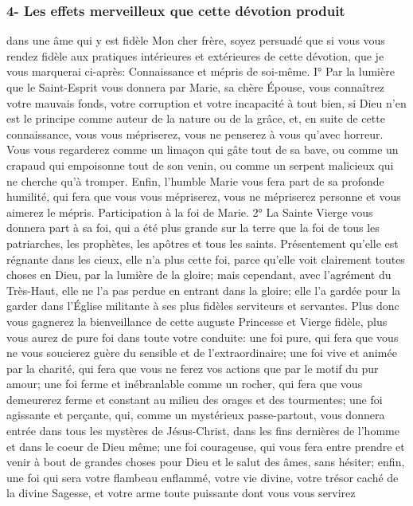 \subsubsection{4- Les effets merveilleux que cette dévotion produit}
dans une âme qui y est fidèle
 Mon cher frère, soyez persuadé que si vous vous rendez fidèle aux pratiques intérieures et extérieures de
cette dévotion, que je vous marquerai ci-après:
Connaissance et mépris de soi-même.
I° Par la lumière que le Saint-Esprit vous donnera par Marie, sa chère Épouse, vous connaîtrez votre mauvais
fonds, votre corruption et votre incapacité à tout bien, si Dieu n'en est le principe comme auteur de la nature ou de
la grâce, et, en suite de cette connaissance, vous vous mépriserez, vous ne penserez à vous qu'avec horreur.
Vous vous regarderez comme un limaçon qui gâte tout de sa bave, ou comme un crapaud qui empoisonne tout de
son venin, ou comme un serpent malicieux qui ne cherche qu'à tromper. Enfin, l'humble Marie vous fera part de sa
profonde humilité, qui fera que vous vous mépriserez, vous ne mépriserez personne et vous aimerez le mépris.
Participation à la foi de Marie.
 2° La Sainte Vierge vous donnera part à sa foi, qui a été plus grande sur la terre que la foi de tous les
patriarches, les prophètes, les apôtres et tous les saints. Présentement qu'elle est régnante dans les cieux, elle n'a
plus cette foi, parce qu'elle voit clairement toutes choses en Dieu, par la lumière de la gloire; mais cependant, avec
l'agrément du Très-Haut, elle ne l'a pas perdue en entrant dans la gloire; elle l'a gardée pour la garder dans l'Église
militante à ses plus fidèles serviteurs et servantes. Plus donc vous gagnerez la bienveillance de cette auguste
Princesse et Vierge fidèle, plus vous aurez de pure foi dans toute votre conduite: une foi pure, qui fera que vous ne
vous soucierez guère du sensible et de l'extraordinaire; une foi vive et animée par la charité, qui fera que vous ne
ferez vos actions que par le motif du pur amour; une foi ferme et inébranlable comme un rocher, qui fera que vous
demeurerez ferme et constant au milieu des orages et des tourmentes; une foi agissante et perçante, qui, comme
un mystérieux passe-partout, vous donnera entrée dans tous les mystères de Jésus-Christ, dans les fins dernières
de l'homme et dans le coeur de Dieu même; une foi courageuse, qui vous fera entre prendre et venir à bout de
grandes choses pour Dieu et le salut des âmes, sans hésiter; enfin, une foi qui sera votre flambeau enflammé,
votre vie divine, votre trésor caché de la divine Sagesse, et votre arme toute puissante dont vous vous servirez
